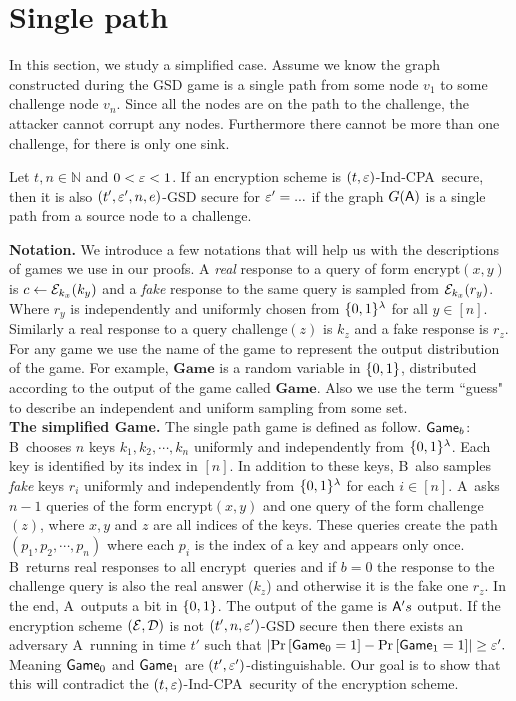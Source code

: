 \documentclass{article}
\newcommand{\tcpa}{$(t,\eps)$-Ind-CPA}
\def\B{{\sf B}}
\def\A{{\sf A}}
\def\E{{\cal E}}
\def\D{{\cal D}}
\newcommand{\encrypt}{{\sf encrypt}}
\newcommand{\game}{{\sf Game}}
\newcommand{\dgame}{{\mathbf{Game}}}
\def\challenge{{\sf challenge}}
\begin{document}
\fi
\section{Single path} %

In this section, we study a simplified case. Assume we know the graph constructed during the GSD game is a single path from some node $v_1$ to some challenge node $v_n$. Since all the nodes are on the path to the challenge, the attacker cannot corrupt any nodes. Furthermore there cannot be more than one challenge, for there is only one sink. \\

\begin{theorem}
Let $t,n \in \mathbb{N}$  and $0<\varepsilon<1$. If an encryption scheme is \tcpa~secure, then it is also $(t',\varepsilon',n,e)$-GSD secure for $\varepsilon'= ...$ if the graph $G(\A)$ is a single path from a source node to a challenge.
\end{theorem}

\noindent \textbf{Notation.} We introduce a few notations that will help us with the descriptions of games we use in our proofs. A \textit{real} response to a query of form \encrypt$(x,y)$ is $c\leftarrow \E_{k_x}(k_{y})$ and a \textit{fake} response to the same query is sampled from $\E_{k_x}(r_{y})$. Where $r_y$ is independently and uniformly chosen from $\{0,1\}^\lambda$ for all $y\in [n]$. Similarly a real response to a query \challenge$(z)$ is $k_z$ and a fake response is $r_z$. For any game we use the name of the game to represent the output distribution of the game. For example, $\dgame$ is a random variable in $\{0,1\}$, distributed according to the output of the game called $\dgame$. Also we use the term ``guess" to describe an independent and uniform sampling from some set.\\

\noindent \textbf{The simplified Game.} The single path game is defined as follow. $\game_b$: \B~chooses $n$ keys $k_1,k_2,\cdots,k_n$ uniformly and independently from $\{0,1\}^\lambda$. Each key is identified by its index in $[n]$. In addition to these keys, \B~also samples \textit{fake} keys $r_i$ uniformly and independently from $\{0,1\}^\lambda$ for each $i\in [n]$. \A~asks $n-1$ queries of the form \encrypt$(x,y)$ and one query of the form \challenge$(z)$, where $x,y$ and $z$ are all indices of the keys. These queries create the path $(p_1,p_2,\cdots, p_n)$ where each $p_i$ is the index of a key and appears only once.  \B~returns real responses to all \encrypt~queries and if $b=0$ the response to the challenge query is also the real answer ($k_{z}$) and otherwise it is the fake one $r_{z}$. In the end, \A~outputs a bit in $\{0,1\}$. The output of the game is $\A's$ output. If the encryption scheme $(\E,\D)$ is not $(t',n,\varepsilon')$-GSD secure then there exists an adversary \A~running in time $t'$ such that
$\abs{\prob{\game_0=1}-\prob{\game_1=1}}\geq \eps'.$
Meaning $\game_0$ and $\game_1$ are $(t',\varepsilon')$-distinguishable. Our goal is to show that this will contradict the \tcpa~security of the encryption scheme. \\
\end{document}
